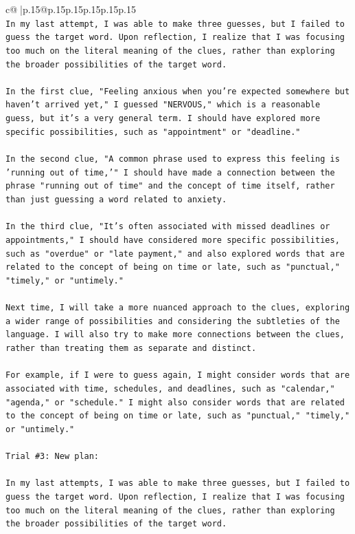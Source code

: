 \documentclass{article}
\begin{document}
{\begin{supertabular}{c@{$\;$}|p{.15\linewidth}@{}p{.15\linewidth}p{.15\linewidth}p{.15\linewidth}p{.15\linewidth}p{.15\linewidth}}
{{{\\ 
\texttt{In my last attempt, I was able to make three guesses, but I failed to guess the target word. Upon reflection, I realize that I was focusing too much on the literal meaning of the clues, rather than exploring the broader possibilities of the target word. } \\
\\ 
\texttt{In the first clue, "Feeling anxious when you're expected somewhere but haven't arrived yet," I guessed "NERVOUS," which is a reasonable guess, but it's a very general term. I should have explored more specific possibilities, such as "appointment" or "deadline."} \\
\\ 
\texttt{In the second clue, "A common phrase used to express this feeling is 'running out of time,'" I should have made a connection between the phrase "running out of time" and the concept of time itself, rather than just guessing a word related to anxiety.} \\
\\ 
\texttt{In the third clue, "It's often associated with missed deadlines or appointments," I should have considered more specific possibilities, such as "overdue" or "late payment," and also explored words that are related to the concept of being on time or late, such as "punctual," "timely," or "untimely."} \\
\\ 
\texttt{Next time, I will take a more nuanced approach to the clues, exploring a wider range of possibilities and considering the subtleties of the language. I will also try to make more connections between the clues, rather than treating them as separate and distinct. } \\
\\ 
\texttt{For example, if I were to guess again, I might consider words that are associated with time, schedules, and deadlines, such as "calendar," "agenda," or "schedule." I might also consider words that are related to the concept of being on time or late, such as "punctual," "timely," or "untimely."} \\
\\ 
\texttt{Trial \#3: New plan: } \\
\\ 
\texttt{In my last attempts, I was able to make three guesses, but I failed to guess the target word. Upon reflection, I realize that I was focusing too much on the literal meaning of the clues, rather than exploring the broader possibilities of the target word. } \\
}}}
\end{supertabular}}
\end{document}
